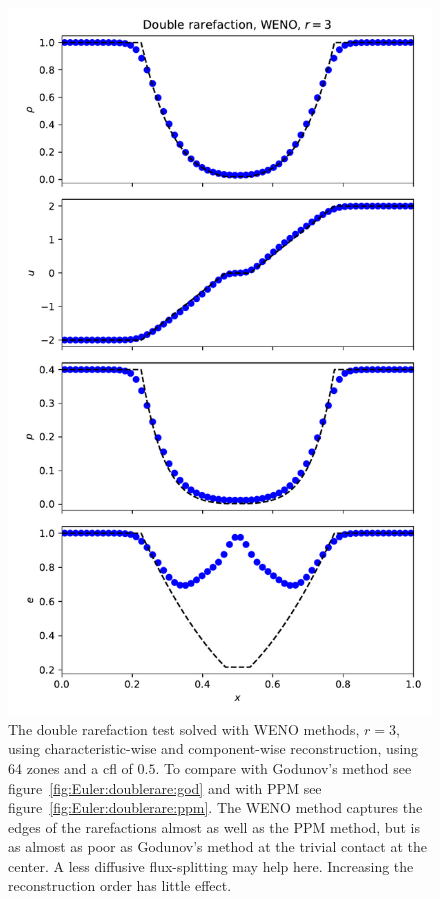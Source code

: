 \begin{figure}[t]
\centering
\includegraphics[width=0.8\linewidth]{weno-euler-rarefaction-r3}
\caption[WENO $r=3$ for the double rarefaction test]
{\label{fig:weno-euler-rarefaction-r3} The double rarefaction test solved with WENO methods, $r=3$, using characteristic-wise and component-wise reconstruction, using 64 zones and a cfl of $0.5$. To compare with Godunov's method see figure~\ref{fig:Euler:doublerare:god} and with PPM see figure~\ref{fig:Euler:doublerare:ppm}. The WENO method captures the edges of the rarefactions almost as well as the PPM method, but is as almost as poor as Godunov's method at the trivial contact at the center. A less diffusive flux-splitting may help here. Increasing the reconstruction order has little effect.\\
}
\end{figure}
%

